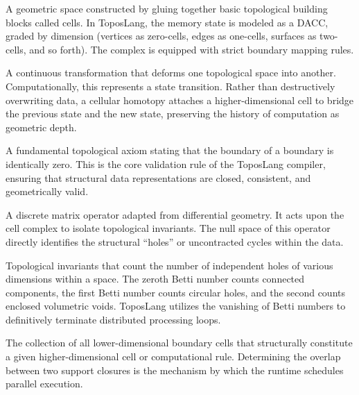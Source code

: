 \documentclass[11pt, a4paper]{article}
\begin{document}
\begin{description}[style=unboxed, leftmargin=0cm]
    \item[\textbf{Directed Acyclic Cell Complex (DACC)}] 
    A geometric space constructed by gluing together basic topological building blocks called cells. In ToposLang, the memory state is modeled as a DACC, graded by dimension (vertices as zero-cells, edges as one-cells, surfaces as two-cells, and so forth). The complex is equipped with strict boundary mapping rules.

    \item[\textbf{Cellular Homotopy}] 
    A continuous transformation that deforms one topological space into another. Computationally, this represents a state transition. Rather than destructively overwriting data, a cellular homotopy attaches a higher-dimensional cell to bridge the previous state and the new state, preserving the history of computation as geometric depth.

    \item[\textbf{Boundary Nilpotency}] 
    A fundamental topological axiom stating that the boundary of a boundary is identically zero. This is the core validation rule of the ToposLang compiler, ensuring that structural data representations are closed, consistent, and geometrically valid.

    \item[\textbf{Combinatorial Hodge Laplacian}] 
    A discrete matrix operator adapted from differential geometry. It acts upon the cell complex to isolate topological invariants. The null space of this operator directly identifies the structural ``holes'' or uncontracted cycles within the data.

    \item[\textbf{Betti Numbers}] 
    Topological invariants that count the number of independent holes of various dimensions within a space. The zeroth Betti number counts connected components, the first Betti number counts circular holes, and the second counts enclosed volumetric voids. ToposLang utilizes the vanishing of Betti numbers to definitively terminate distributed processing loops.
    
    \item[\textbf{Spatial Support Closure}] 
    The collection of all lower-dimensional boundary cells that structurally constitute a given higher-dimensional cell or computational rule. Determining the overlap between two support closures is the mechanism by which the runtime schedules parallel execution.
\end{description}
\end{document}
